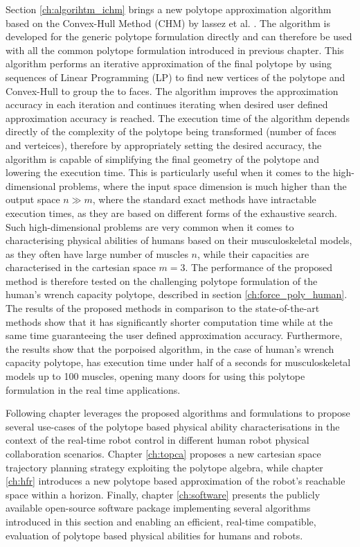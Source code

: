 Section \ref{ch:algorihtm_ichm} brings a new polytope approximation algorithm based on the Convex-Hull Method (CHM) by lassez et al. \cite{lassez1992quantifier}. The algorithm is developed for the generic polytope formulation directly and can therefore be used with all the common polytope formulation introduced in previous chapter. This algorithm performs an iterative approximation of the final polytope by using sequences of Linear Programming (LP) to find new vertices of the polytope and Convex-Hull to group the to faces. The algorithm improves the approximation accuracy in each iteration and continues iterating when desired user defined approximation accuracy is reached. The execution time of the algorithm depends directly of the complexity of the polytope being transformed (number of faces and verteices), therefore by appropriately setting the desired accuracy, the algorithm is capable of simplifying the final geometry of the polytope and lowering the execution time. This is particularly useful when it comes to the high-dimensional problems, where the input space dimension is much higher than the output space $n\!\gg \!m$, where the standard exact methods have intractable execution times, as they are based on different forms of the exhaustive search. Such high-dimensional problems are very common when it comes to characterising physical abilities of humans based on their musculoskeletal models, as they often have large number of muscles $n$, while their capacities are characterised in the cartesian space $m=3$. The performance of the proposed method is therefore tested on the challenging polytope formulation of the human's wrench capacity polytope, described in section \ref{ch:force_poly_human}. The results of the proposed methods in comparison to the state-of-the-art methods show that it has significantly shorter computation time while at the same time guaranteeing the user defined approximation accuracy. Furthermore, the results show that the porpoised algorithm, in the case of human's wrench capacity polytope, has execution time under half of a seconds for musculoskeletal models up to 100 muscles, opening many doors for using this polytope formulation in the real time applications.

Following chapter leverages the proposed algorithms and formulations to propose several use-cases of the polytope based physical ability characterisations in the context of the real-time robot control in different human robot physical collaboration scenarios. Chapter \ref{ch:topca} proposes a new cartesian space trajectory planning strategy exploiting the polytope algebra, while chapter \ref{ch:hfr} introduces a new polytope based approximation of the robot's reachable space within a horizon. Finally, chapter \ref{ch:software} presents the publicly available open-source software package implementing several algorithms introduced in this section and enabling an efficient, real-time compatible, evaluation of polytope based physical abilities for humans and robots.
